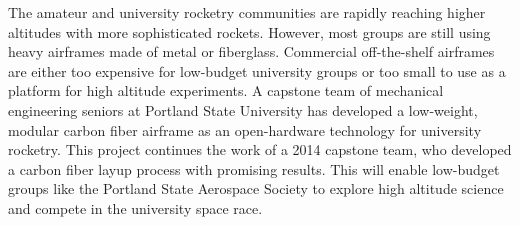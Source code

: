 \documentclass[24pt]{minimal}
\begin{document}
\parbox{10in}{
The amateur and university rocketry communities are rapidly reaching higher altitudes with more sophisticated rockets. However, most groups are still using heavy airframes made of metal or fiberglass. Commercial off-the-shelf airframes are either too expensive for low-budget university groups or too small to use as a platform for high altitude experiments. 
A capstone team of mechanical engineering seniors at Portland State University has developed a low-weight, modular carbon fiber airframe as an open-hardware technology for university rocketry. 
This project continues the work of a 2014 capstone team, who developed a carbon fiber layup process with promising results. 
This will enable low-budget groups like the Portland State Aerospace Society to explore high altitude science and compete in the university space race.  


\def\svgwidth{\linewidth}

\label{fig:moduleDiagram}
\hfill

\label{fig:coupon}
}
\end{document}
